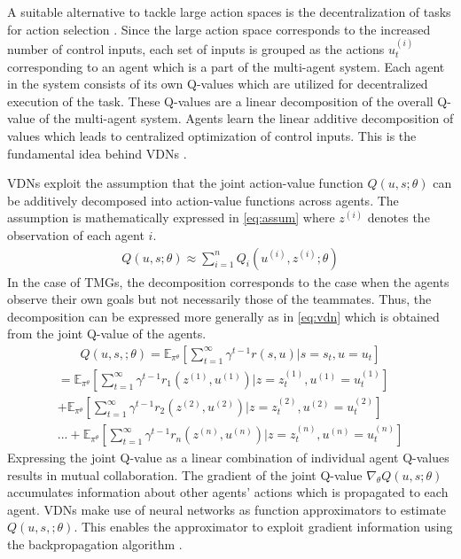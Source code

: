 \documentclass{article}
\begin{document}
\begin{multicols}{2}
A suitable alternative to tackle large action spaces is the decentralization of tasks for action selection \cite{vdn}. Since the large action space corresponds to the increased number of control inputs, each set of inputs is grouped as the actions $u_{t}^{(i)}$ corresponding to an agent which is a part of the multi-agent system. Each agent in the system consists of its own Q-values which are utilized for decentralized execution of the task. These Q-values are a linear decomposition of the overall Q-value of the multi-agent system. Agents learn the linear additive decomposition of values which leads to centralized optimization of control inputs. This is the fundamental idea behind VDNs \cite{vdn}.

VDNs exploit the assumption that the joint action-value function $Q(u,s;\theta)$ can be additively decomposed into action-value functions across agents. The assumption is mathematically expressed in \autoref{eq:assum} where $z^{(i)}$ denotes the observation of each agent $i$.
\begin{gather}
  Q(u,s;\theta) \approx \sum_{i=1}^{n}Q_{i}(u^{(i)},z^{(i)};\theta)\label{eq:assum}
\end{gather}
In the case of TMGs, the decomposition corresponds to the case when the agents observe their own goals but not necessarily those of the teammates. Thus, the decomposition can be expressed more generally as in \autoref{eq:vdn} which is obtained from the joint Q-value of the agents.
\begin{gather}
  Q(u,s,;\theta) = \mathbb{E}_{\pi^{\theta}}[\sum_{t=1}^{\infty}\gamma^{t-1}r(s,u)|s=s_{t}, u=u_{t}] \nonumber
\end{gather}
\begin{multline}
  = \mathbb{E}_{\pi^{\theta}}[\sum_{t=1}^{\infty}\gamma^{t-1}r_{1}(z^{(1)},u^{(1)})|z=z^{(1)}_{t}, u^{(1)}=u^{(1)}_{t}]\\ + \mathbb{E}_{\pi^{\theta}}[\sum_{t=1}^{\infty}\gamma^{t-1}r_{2}(z^{(2)},u^{(2)})|z=z^{(2)}_{t}, u^{(2)}=u^{(2)}_{t}]\\ ... +\mathbb{E}_{\pi^{\theta}}[\sum_{t=1}^{\infty}\gamma^{t-1}r_{n}(z^{(n)},u^{(n)})|z=z^{(n)}_{t}, u^{(n)}=u^{(n)}_{t}] \label{eq:vdn}
\end{multline}
Expressing the joint Q-value as a linear combination of individual agent Q-values results in mutual collaboration. The gradient of the joint Q-value $\nabla_{\theta}Q(u,s;\theta)$ accumulates information about other agents' actions which is propagated to each agent. VDNs make use of neural networks \cite{cnn} as function approximators to estimate $Q(u,s,;\theta)$. This enables the approximator to exploit gradient information using the backpropagation algorithm \cite{cnn}. 


\end{multicols}
\end{document}

